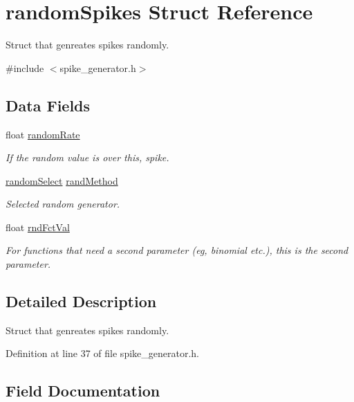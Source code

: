 \hypertarget{structrandom_spikes}{}\section{random\+Spikes Struct Reference}
\label{structrandom_spikes}


Struct that genreates spikes randomly.  




{\ttfamily \#include $<$spike\+\_\+generator.\+h$>$}

\subsection*{Data Fields}
\begin{DoxyCompactItemize}
\item 
float \hyperlink{structrandom_spikes_a1333eb5695ae83d1ffccf24b08bc6288}{random\+Rate}
\begin{DoxyCompactList}\small\item\em If the random value is over this, spike. \end{DoxyCompactList}\item 
\hyperlink{spike__generator_8h_ad05574e5624d82eeb7acf436ba8802f6}{random\+Select} \hyperlink{structrandom_spikes_a39c666ed4c7b487b1586c2c01b5afcdc}{rand\+Method}
\begin{DoxyCompactList}\small\item\em Selected random generator. \end{DoxyCompactList}\item 
float \hyperlink{structrandom_spikes_a0eb8199754a403ccc8eac256f9193a02}{rnd\+Fct\+Val}
\begin{DoxyCompactList}\small\item\em For functions that need a second parameter (eg, binomial etc.), this is the second parameter. \end{DoxyCompactList}\end{DoxyCompactItemize}


\subsection{Detailed Description}
Struct that genreates spikes randomly. 



Definition at line 37 of file spike\+\_\+generator.\+h.



\subsection{Field Documentation}
\hypertarget{structrandom_spikes_a39c666ed4c7b487b1586c2c01b5afcdc}{}
